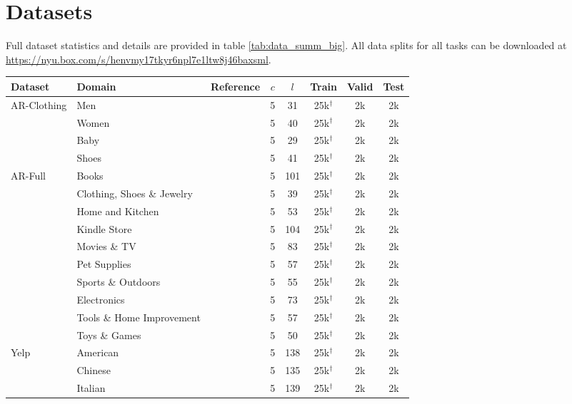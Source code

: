 \section{Datasets}
\label{app:data}
Full dataset statistics and details are provided in table \ref{tab:data_summ_big}.
All data splits for all tasks can be downloaded at \url{https://nyu.box.com/s/henvmy17tkyr6npl7e1ltw8j46baxsml}. 

\begin{table*}[t]
\small
\centering
\begin{tabular}{llcccccc}
\toprule
Dataset & Domain & Reference & $c$ & $l$ & Train & Valid & Test \\
\midrule
\multirow{4}{*}{AR-Clothing}
& Men & \citealt{jianmo}  & 5 & 31 & 25k$^\dagger$ & 2k & 2k\\
& Women & \citealt{jianmo}  & 5 & 40 & 25k$^\dagger$ & 2k & 2k\\
& Baby & \citealt{jianmo} & 5 & 29 & 25k$^\dagger$ & 2k & 2k\\
& Shoes & \citealt{jianmo} & 5 & 41 & 25k$^\dagger$ & 2k & 2k\\
\midrule
\multirow{10}{*}{AR-Full}
& Books & \citealt{jianmo} & 5 & 101 & 25k$^\dagger$ & 2k & 2k\\
& Clothing, Shoes \& Jewelry & \citealt{jianmo} & 5 & 39 & 25k$^\dagger$ & 2k & 2k\\
& Home and Kitchen & \citealt{jianmo} & 5 & 53 & 25k$^\dagger$ & 2k & 2k\\
& Kindle Store & \citealt{jianmo} & 5 & 104 & 25k$^\dagger$ & 2k & 2k\\
& Movies \& TV & \citealt{jianmo} & 5 & 83 & 25k$^\dagger$ & 2k & 2k\\
& Pet Supplies & \citealt{jianmo} & 5 & 57 & 25k$^\dagger$ & 2k & 2k\\
& Sports \& Outdoors & \citealt{jianmo} & 5 & 55 & 25k$^\dagger$ & 2k & 2k\\
& Electronics & \citealt{jianmo} & 5 & 73 & 25k$^\dagger$ & 2k & 2k\\
& Tools \& Home Improvement & \citealt{jianmo} & 5 & 57 & 25k$^\dagger$ & 2k & 2k\\
& Toys \& Games & \citealt{jianmo} & 5 & 50 & 25k$^\dagger$ & 2k & 2k\\
\midrule
\multirow{4}{*}{Yelp} 
& American & \citealt{yelp} & 5 & 138 & 25k$^\dagger$ & 2k & 2k \\
& Chinese & \citealt{yelp} & 5 & 135 & 25k$^\dagger$ & 2k & 2k\\
& Italian & \citealt{yelp} & 5 & 139 & 25k$^\dagger$ & 2k & 2k\\

\end{tabular}
\end{table*}
